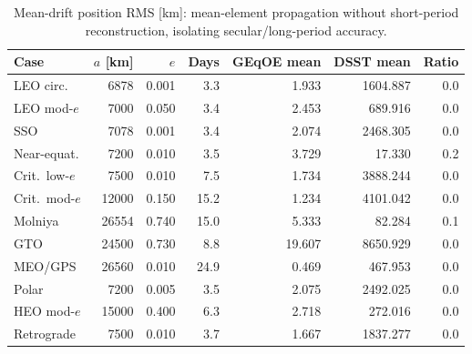\begin{table}[ht]
\centering
\caption{Mean-drift position RMS [km]: mean-element propagation without
short-period reconstruction, isolating secular/long-period accuracy.}
\label{tab:dsst_mean_drift}
\small
\begin{tabular}{@{}lrrrrrr@{}}
\toprule
Case & $a$ [km] & $e$ & Days & GEqOE mean & DSST mean & Ratio \\
\midrule
LEO circ. & 6878 & 0.001 & 3.3 & 1.933 & 1604.887 & 0.0 \\
LEO mod-$e$ & 7000 & 0.050 & 3.4 & 2.453 & 689.916 & 0.0 \\
SSO & 7078 & 0.001 & 3.4 & 2.074 & 2468.305 & 0.0 \\
Near-equat. & 7200 & 0.010 & 3.5 & 3.729 & 17.330 & 0.2 \\
Crit.\ low-$e$ & 7500 & 0.010 & 7.5 & 1.734 & 3888.244 & 0.0 \\
Crit.\ mod-$e$ & 12000 & 0.150 & 15.2 & 1.234 & 4101.042 & 0.0 \\
Molniya & 26554 & 0.740 & 15.0 & 5.333 & 82.284 & 0.1 \\
GTO & 24500 & 0.730 & 8.8 & 19.607 & 8650.929 & 0.0 \\
MEO/GPS & 26560 & 0.010 & 24.9 & 0.469 & 467.953 & 0.0 \\
Polar & 7200 & 0.005 & 3.5 & 2.075 & 2492.025 & 0.0 \\
HEO mod-$e$ & 15000 & 0.400 & 6.3 & 2.718 & 272.016 & 0.0 \\
Retrograde & 7500 & 0.010 & 3.7 & 1.667 & 1837.277 & 0.0 \\
\bottomrule
\end{tabular}
\end{table}